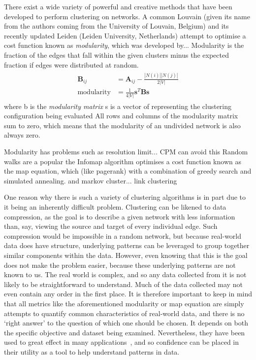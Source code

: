 There exist a wide variety of powerful and creative methods that have been developed to perform clustering on networks. A common 
Louvain (given its name from the authors coming from the University of Louvain, Belgium) and its recently updated Leiden (Leiden University, Netherlands) attempt to optimise a cost function known as \textit{modularity}, which was developed by...
Modularity is the fraction of the edges that fall within the given clusters minus the expected fraction if edges were distributed at random.
\begin{align}
\begin{split}
    \mathbf{B}_{ij} &= \mathbf{A}_{ij} - \frac{|N(i)||N(j)|}{2|V|}\\
    \mathrm{modularity} &= \frac{1}{4|V|}\mathbf{s}^T\mathbf{Bs}
\end{split}
\label{eq:modularity}
\end{align}
where b is the \emph{modularity matrix} s is a vector of representing the clustering configuration being evaluated
All rows and columns of the modularity matrix sum to zero, which means that the modularity of an undivided network is also always zero.

Modularity has problems such as resolution limit... CPM can avoid this
Random walks are a popular the Infomap algorithm optimises a cost function known as the map equation, which (like pagerank) with a combination of greedy search and simulated annealing.
and markov cluster...
link clustering

One reason why there is such a variety of clustering algorithms is in part due to it being an inherently difficult problem.
Clustering can be likened to data compression, as the goal is to describe a given network with less information than, say, viewing the source and target of every individual edge. Such compression would be impossible in a random network, but because real-world data does have structure, underlying patterns can be leveraged to group together similar components within the data.
However, even knowing that this is the goal does not make the problem easier, because these underlying patterns are not known to us. The real world is complex, and so any data collected from it is not likely to be straightforward to understand. Much of the data collected may not even contain any order in the first place.
It is therefore important to keep in mind that all metrics like the aforementioned modularity or map equation are simply attempts to quantify common characteristics of real-world data, and there is no `right answer' to the question of which one should be chosen. It depends on both the specific objective and dataset being examined. Nevertheless, they have been used to great effect in many applications~\cite{TODO}, and so confidence can be placed in their utility as a tool to help understand patterns in data.


